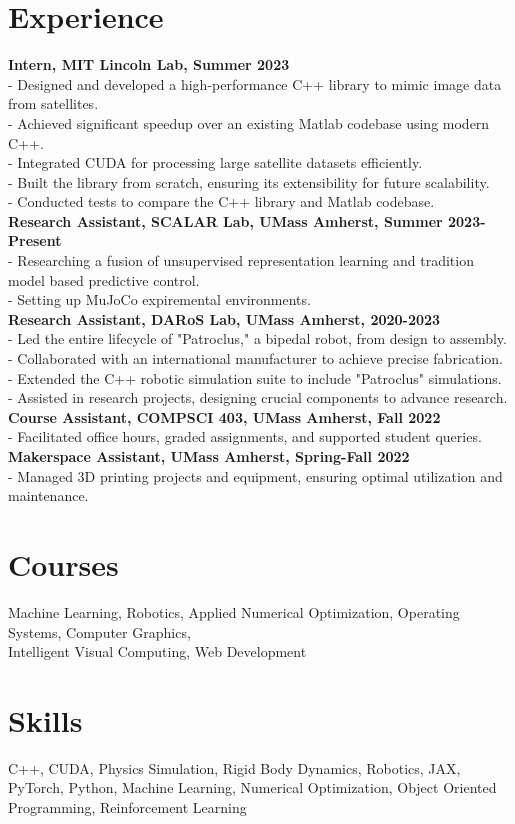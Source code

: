 \documentclass[letterpaper, 10pt]{article}
\begin{document}
\section*{Experience}
\textbf{Intern, MIT Lincoln Lab, Summer 2023} \\
- Designed and developed a high-performance C++ library to mimic image data from satellites. \\
- Achieved significant speedup over an existing Matlab codebase using modern C++. \\
- Integrated CUDA for processing large satellite datasets efficiently. \\
- Built the library from scratch, ensuring its extensibility for future scalability. \\
- Conducted tests to compare the C++ library and Matlab codebase.\\

\noindent
\textbf{Research Assistant, SCALAR Lab, UMass Amherst, Summer 2023-Present} \\
- Researching a fusion of unsupervised representation learning and tradition model based predictive control. \\
- Setting up MuJoCo expiremental environments. \\

\noindent
\textbf{Research Assistant, DARoS Lab, UMass Amherst, 2020-2023} \\
- Led the entire lifecycle of "Patroclus," a bipedal robot, from design to assembly. \\
- Collaborated with an international manufacturer to achieve precise fabrication. \\
- Extended the C++ robotic simulation suite to include "Patroclus" simulations. \\
- Assisted in research projects, designing crucial components to advance research.\\

\noindent
\textbf{Course Assistant, COMPSCI 403, UMass Amherst, Fall 2022} \\
- Facilitated office hours, graded assignments, and supported student queries.\\

\noindent
\textbf{Makerspace Assistant, UMass Amherst, Spring-Fall 2022} \\
- Managed 3D printing projects and equipment, ensuring optimal utilization and maintenance.\\

\section*{Courses}
Machine Learning, Robotics, Applied Numerical Optimization, Operating Systems, Computer Graphics,\\ Intelligent Visual Computing, Web Development

\section*{Skills}
C++, CUDA, Physics Simulation, Rigid Body Dynamics, Robotics, JAX, PyTorch, Python, Machine Learning, Numerical Optimization, Object Oriented Programming, Reinforcement Learning
\end{document}
